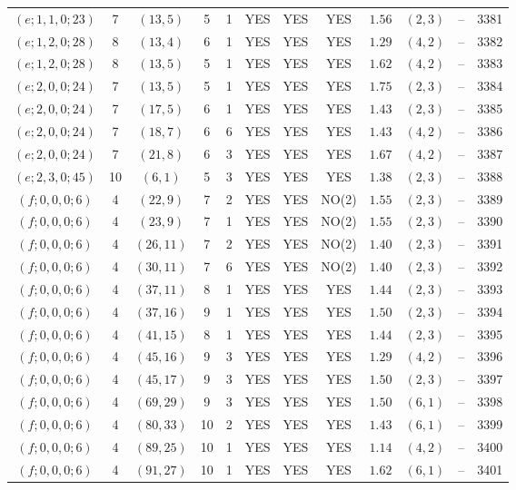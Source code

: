 \begin{longtable}{|c|c|c|c|c|c|c|c|c|c|c|c|}
$(e;1,1,0;23)$ & 7 & $(13,5)$ & 5 & 1 & YES & YES & YES & $1.56$ & $(2,3)$ & -- & 3381\\
$(e;1,2,0;28)$ & 8 & $(13,4)$ & 6 & 1 & YES & YES & YES & $1.29$ & $(4,2)$ & -- & 3382\\
$(e;1,2,0;28)$ & 8 & $(13,5)$ & 5 & 1 & YES & YES & YES & $1.62$ & $(4,2)$ & -- & 3383\\
$(e;2,0,0;24)$ & 7 & $(13,5)$ & 5 & 1 & YES & YES & YES & $1.75$ & $(2,3)$ & -- & 3384\\
$(e;2,0,0;24)$ & 7 & $(17,5)$ & 6 & 1 & YES & YES & YES & $1.43$ & $(2,3)$ & -- & 3385\\
$(e;2,0,0;24)$ & 7 & $(18,7)$ & 6 & 6 & YES & YES & YES & $1.43$ & $(4,2)$ & -- & 3386\\
$(e;2,0,0;24)$ & 7 & $(21,8)$ & 6 & 3 & YES & YES & YES & $1.67$ & $(4,2)$ & -- & 3387\\
$(e;2,3,0;45)$ & 10 & $(6,1)$ & 5 & 3 & YES & YES & YES & $1.38$ & $(2,3)$ & -- & 3388\\
$(f;0,0,0;6)$ & 4 & $(22,9)$ & 7 & 2 & YES & YES & NO(2) & $1.55$ & $(2,3)$ & -- & 3389\\
$(f;0,0,0;6)$ & 4 & $(23,9)$ & 7 & 1 & YES & YES & NO(2) & $1.55$ & $(2,3)$ & -- & 3390\\
$(f;0,0,0;6)$ & 4 & $(26,11)$ & 7 & 2 & YES & YES & NO(2) & $1.40$ & $(2,3)$ & -- & 3391\\
$(f;0,0,0;6)$ & 4 & $(30,11)$ & 7 & 6 & YES & YES & NO(2) & $1.40$ & $(2,3)$ & -- & 3392\\
$(f;0,0,0;6)$ & 4 & $(37,11)$ & 8 & 1 & YES & YES & YES & $1.44$ & $(2,3)$ & -- & 3393\\
$(f;0,0,0;6)$ & 4 & $(37,16)$ & 9 & 1 & YES & YES & YES & $1.50$ & $(2,3)$ & -- & 3394\\
$(f;0,0,0;6)$ & 4 & $(41,15)$ & 8 & 1 & YES & YES & YES & $1.44$ & $(2,3)$ & -- & 3395\\
$(f;0,0,0;6)$ & 4 & $(45,16)$ & 9 & 3 & YES & YES & YES & $1.29$ & $(4,2)$ & -- & 3396\\
$(f;0,0,0;6)$ & 4 & $(45,17)$ & 9 & 3 & YES & YES & YES & $1.50$ & $(2,3)$ & -- & 3397\\
$(f;0,0,0;6)$ & 4 & $(69,29)$ & 9 & 3 & YES & YES & YES & $1.50$ & $(6,1)$ & -- & 3398\\
$(f;0,0,0;6)$ & 4 & $(80,33)$ & 10 & 2 & YES & YES & YES & $1.43$ & $(6,1)$ & -- & 3399\\
$(f;0,0,0;6)$ & 4 & $(89,25)$ & 10 & 1 & YES & YES & YES & $1.14$ & $(4,2)$ & -- & 3400\\
$(f;0,0,0;6)$ & 4 & $(91,27)$ & 10 & 1 & YES & YES & YES & $1.62$ & $(6,1)$ & -- & 3401\\

\end{longtable}
